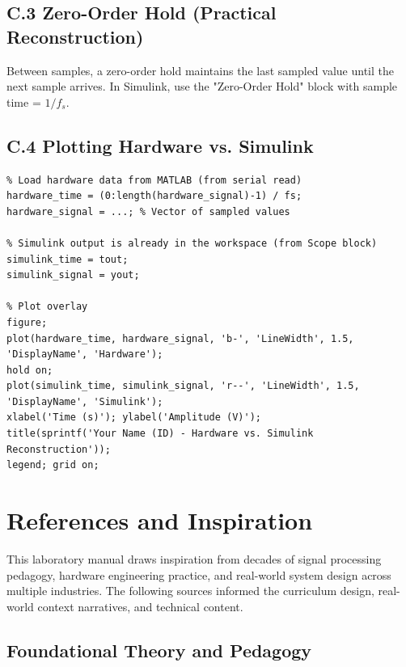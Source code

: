 \documentclass[11pt,letterpaper]{article}
\begin{document}
\subsection*{C.3 Zero-Order Hold (Practical Reconstruction)}

Between samples, a zero-order hold maintains the last sampled value until the next sample arrives. In Simulink, use the "Zero-Order Hold" block with sample time = $1/f_s$.

\subsection*{C.4 Plotting Hardware vs. Simulink}

\begin{verbatim}
% Load hardware data from MATLAB (from serial read)
hardware_time = (0:length(hardware_signal)-1) / fs;
hardware_signal = ...; % Vector of sampled values

% Simulink output is already in the workspace (from Scope block)
simulink_time = tout;
simulink_signal = yout;

% Plot overlay
figure;
plot(hardware_time, hardware_signal, 'b-', 'LineWidth', 1.5, 'DisplayName', 'Hardware');
hold on;
plot(simulink_time, simulink_signal, 'r--', 'LineWidth', 1.5, 'DisplayName', 'Simulink');
xlabel('Time (s)'); ylabel('Amplitude (V)');
title(sprintf('Your Name (ID) - Hardware vs. Simulink Reconstruction'));
legend; grid on;
\end{verbatim}

\clearpage

\section*{References and Inspiration}

This laboratory manual draws inspiration from decades of signal processing pedagogy, hardware engineering practice, and real-world system design across multiple industries. The following sources informed the curriculum design, real-world context narratives, and technical content.

\subsection*{Foundational Theory and Pedagogy}
\end{document}
